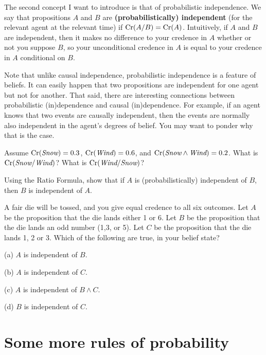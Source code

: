 The second concept I want to introduce is that of probabilistic
independence. We say that propositions $A$ and $B$ are
\textbf{(probabilistically) independent} (for the relevant agent at
the relevant time) if $\text{Cr}(A/B) = \text{Cr}(A)$. Intuitively, if $A$ and $B$
are independent, then it makes no difference to your credence in $A$
whether or not you suppose $B$, so your unconditional credence in $A$
is equal to your credence in $A$ conditional on $B$.

Note that unlike causal independence, probabilistic independence is a
feature of beliefs. It can easily happen that two propositions are
independent for one agent but not for another. That said, there are
interesting connections between probabilistic (in)dependence and
causal (in)dependence. For example, if an agent knows that two events
are causally independent, then the events are normally also
independent in the agent's degrees of belief. You may want to ponder
why that is the case. 

\begin{exercise1}
  Assume $\text{Cr}(\emph{Snow}) = 0.3$, $\text{Cr}(\emph{Wind}) = 0.6$, and $\text{Cr}(\emph{Snow} \land
  \emph{Wind}) = 0.2$. What is $\text{Cr}(\emph{Snow}/\emph{Wind})$? What is $\text{Cr}(\emph{Wind}/\emph{Snow})$? 
\end{exercise1}

\begin{exercise2}
  Using the Ratio Formula, show that if $A$ is (probabilistically)
  independent of $B$, then $B$ is independent of $A$.
\end{exercise2}

\begin{exercise2}
  A fair die will be tossed, and you give equal credence to all six
  outcomes. Let $A$ be the proposition that the die lands either 1 or
  6. Let $B$ be the proposition that the die lands an odd number (1,3,
  or 5). Let $C$ be the proposition that the die lands 1, 2 or 3.
  Which of the following are true, in your belief state?
  \begin{exlist}
  \item[(a)] $A$ is independent of $B$. 
  \item[(b)] $A$ is independent of $C$.
  \item[(c)] $A$ is independent of $B \land C$.
  \item[(d)] $B$ is independent of $C$.
  \end{exlist}
\end{exercise2}

\section{Some more rules of probability}


